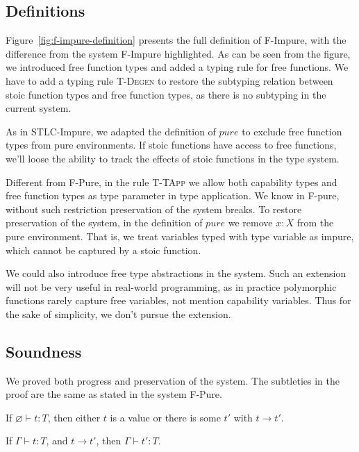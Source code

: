 \subsection{Definitions}

Figure~\ref{fig:f-impure-definition} presents the full definition of
F-Impure, with the difference from the system F-Impure highlighted. As
can be seen from the figure, we introduced free function types and
added a typing rule for free functions. We have to add a typing rule
\textsc{T-Degen} to restore the subtyping relation between stoic
function types and free function types, as there is no subtyping in
the current system.

As in STLC-Impure, we adapted the definition of $pure$ to exclude free
function types from pure environments. If stoic functions have access
to free functions, we'll loose the ability to track the effects of
stoic functions in the type system.

Different from F-Pure, in the rule \textsc{T-TApp} we allow both
capability types and free function types as type parameter in type
application. We know in F-pure, without such restriction preservation
of the system breaks. To restore preservation of the system, in the
definition of $pure$ we remove $x: X$ from the pure environment. That
is, we treat variables typed with type variable as impure, which
cannot be captured by a stoic function.

We could also introduce free type abstractions in the system. Such an
extension will not be very useful in real-world programming, as in
practice polymorphic functions rarely capture free variables, not
mention capability variables. Thus for the sake of simplicity, we
don't pursue the extension.

\subsection{Soundness}

We proved both progress and preservation of the system. The subtleties
in the proof are the same as stated in the system F-Pure.

\begin{theorem}[Progress]
If $\varnothing \vdash t : T$, then either $t$ is a value or there is some
$t'$ with $t \longrightarrow t'$.
\end{theorem}

\begin{theorem}[Preservation]
If $\Gamma \vdash t : T$, and $t \longrightarrow t'$, then $\Gamma
\vdash t' : T$.
\end{theorem}

